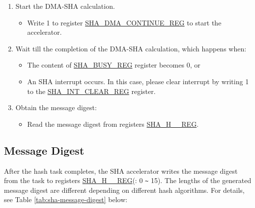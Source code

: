 \documentclass[main\_\_EN.tex]{subfiles}
\begin{document}
\begin{enumerate}
    \item Start the DMA-SHA calculation.
        \begin{itemize}
            \item Write 1 to register \hyperref[regdesc:SHADMACONTINUEREG]{SHA\_DMA\_CONTINUE\_REG} to start the accelerator.
        \end{itemize}
    
    \item Wait till the completion of the DMA-SHA calculation, which happens when:
        \begin{itemize}
            \item The content of \hyperref[regdesc:SHABUSYREG]{SHA\_BUSY\_REG} register becomes 0, or
            \item An SHA interrupt occurs. In this case, please clear interrupt by writing 1 to the \hyperref[regdesc:SHAINTCLEARREG]{SHA\_INT\_CLEAR\_REG} register.
        \end{itemize}
    
    \item Obtain the message digest:
    \begin{itemize}
        \item Read the message digest from registers \hyperref[regdesc:SHAHNREG]{SHA\_H\_\_REG}.
    \end{itemize}
\end{enumerate}


%
\subsection{Message Digest}

After the hash task completes, the SHA accelerator writes the message digest from the task to registers \hyperref[regdesc:SHAHNREG]{SHA\_H\_\_REG}(: 0 \verb+~+ 15). The lengths of the generated message digest are different depending on different hash algorithms. For details, see Table \ref{tab:sha-message-digest} below:
\end{document}
